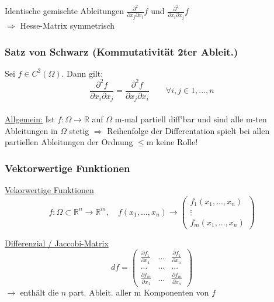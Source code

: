 \documentclass[6pt]{article}
\begin{document}
\begin{multicols*}{3}
	Identische gemischte Ableitungen $\frac{\partial^2}{\partial x_j \partial x_i}f$	 und $\frac{\partial^2}{\partial x_i \partial x_j}f$\\
	$\Rightarrow $ Hesse-Matrix symmetrisch
	\vspace{5mm}
	
	\subsubsection*{Satz von Schwarz (Kommutativit{\"a}t 2ter Ableit.)}
	Sei $f \in C^2(\Omega)$. Dann gilt:
	\[
			\frac{\partial^2f}{\partial x_i \partial x_j} = \frac{\partial^2f}{\partial x_j \partial x_i} \qquad \forall i,j \in {1, ..., n}
	\]
	 \vspace{2mm}\\
	\underline{Allgemein:} Ist $f: \Omega \rightarrow \mathbb{R}$ auf $\Omega$ m-mal partiell diff'bar und sind alle m-ten Ableitungen in $\Omega$ stetig $\Rightarrow$ Reihenfolge der Differentation spielt bei allen partiellen Ableitungen der Ordnung $\leq$m keine Rolle!
	\vspace{4mm}
	
	
	\subsubsection*{Vektorwertige Funktionen}
		
		\underline{Vekorwertige Funktionen}
		\begin{equation*}
				f: \Omega \subset \mathbb{R}^n \to \mathbb{R}^m, \quad f(x_1, ..., x_n) \to 
					\begin{pmatrix}
						f_1(x_1, ..., x_n) \\
						\vdots \\
						f_m(x_1, ..., x_n)
																			
					\end{pmatrix}
		\end{equation*}
		
		\underline{Differenzial / Jaccobi-Matrix}
		\begin{equation*}
				df = 
					\begin{pmatrix}
						\frac{\partial f_1}{\partial x_1} & ... & \frac{\partial f_1}{\partial x_n} \\
						... & ... & ... \\
						\frac{\partial f_m}{\partial x_1} & ... & \frac{\partial f_m}{\partial x_n}
					\end{pmatrix}
		\end{equation*}
		$\rightarrow$ enth{\"a}lt die $n$ part. Ableit. aller m Komponenten von $f$
	

\end{multicols*}
\end{document}
